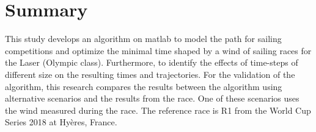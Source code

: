 \chapter*{Summary}


This study develops an algorithm on \acrshort{matlab} to model the path for sailing competitions and optimize the minimal time shaped by a wind of sailing races for the Laser (Olympic class). Furthermore, to identify the effects of time-steps of different size on the resulting times and trajectories. For the validation of the algorithm, this research compares the results between the algorithm using alternative scenarios and the results from the race. One of these scenarios uses the wind measured during the race. The reference race is R1 from the World Cup Series 2018 at Hyères, France. \par  

